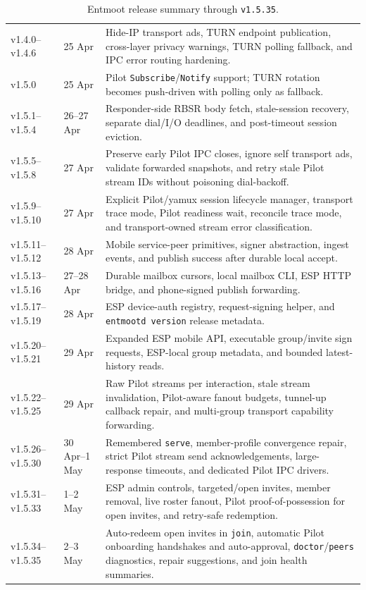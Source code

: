 \documentclass[11pt,a4paper]{article}
\begin{document}
\begin{table}[h]
\begin{tabular}{@{}llp{7cm}@{}}
v1.4.0--v1.4.6 & 25 Apr & Hide-IP transport ads, TURN endpoint publication, cross-layer privacy warnings, TURN polling fallback, and IPC error routing hardening. \\
v1.5.0 & 25 Apr & Pilot \texttt{Subscribe}/\texttt{Notify} support; TURN rotation becomes push-driven with polling only as fallback. \\
v1.5.1--v1.5.4 & 26--27 Apr & Responder-side RBSR body fetch, stale-session recovery, separate dial/I/O deadlines, and post-timeout session eviction. \\
v1.5.5--v1.5.8 & 27 Apr & Preserve early Pilot IPC closes, ignore self transport ads, validate forwarded snapshots, and retry stale Pilot stream IDs without poisoning dial-backoff. \\
v1.5.9--v1.5.10 & 27 Apr & Explicit Pilot/yamux session lifecycle manager, transport trace mode, Pilot readiness wait, reconcile trace mode, and transport-owned stream error classification. \\
v1.5.11--v1.5.12 & 28 Apr & Mobile service-peer primitives, signer abstraction, ingest events, and publish success after durable local accept. \\
v1.5.13--v1.5.16 & 27--28 Apr & Durable mailbox cursors, local mailbox CLI, ESP HTTP bridge, and phone-signed publish forwarding. \\
v1.5.17--v1.5.19 & 28 Apr & ESP device-auth registry, request-signing helper, and \texttt{entmootd version} release metadata. \\
v1.5.20--v1.5.21 & 29 Apr & Expanded ESP mobile API, executable group/invite sign requests, ESP-local group metadata, and bounded latest-history reads. \\
v1.5.22--v1.5.25 & 29 Apr & Raw Pilot streams per interaction, stale stream invalidation, Pilot-aware fanout budgets, tunnel-up callback repair, and multi-group transport capability forwarding. \\
v1.5.26--v1.5.30 & 30 Apr--1 May & Remembered \texttt{serve}, member-profile convergence repair, strict Pilot stream send acknowledgements, large-response timeouts, and dedicated Pilot IPC drivers. \\
v1.5.31--v1.5.33 & 1--2 May & ESP admin controls, targeted/open invites, member removal, live roster fanout, Pilot proof-of-possession for open invites, and retry-safe redemption. \\
v1.5.34--v1.5.35 & 2--3 May & Auto-redeem open invites in \texttt{join}, automatic Pilot onboarding handshakes and auto-approval, \texttt{doctor}/\texttt{peers} diagnostics, repair suggestions, and join health summaries. \\
\bottomrule
\end{tabular}
\caption{Entmoot release summary through \texttt{v1.5.35}.}
\end{table}
\end{document}
